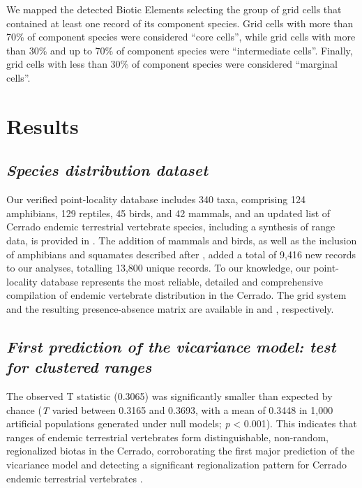 \documentclass[12pt,openright,oneside,a4paper,english]{abntex2}
\begin{document}
We mapped the detected Biotic Elements selecting the group of grid cells that contained at least one record of its component species. Grid cells with more than 70\% of component species were considered “core cells”, while grid cells with more than 30\% and up to 70\% of component species were “intermediate cells”. Finally, grid cells with less than 30\% of component species were considered “marginal cells”.

\section{Results}
\subsection{\textit{Species distribution dataset}}

Our verified point-locality database includes 340 taxa, comprising 124 amphibians, 129 reptiles, 45 birds, and 42 mammals, and an updated list of Cerrado endemic terrestrial vertebrate species, including a synthesis of range data, is provided in . The addition of mammals and birds, as well as the inclusion of amphibians and squamates described after \citet{Azevedo2016}, added a total of 9,416 new records to our analyses, totalling 13,800 unique records. To our knowledge, our point-locality database represents the most reliable, detailed and comprehensive compilation of endemic vertebrate distribution in the Cerrado. The grid system and the resulting presence-absence matrix are available in  and , respectively.

\subsection{\textit{First prediction of the vicariance model: test for clustered ranges}}

The observed T statistic (0.3065) was significantly smaller than expected by chance (\textit{T} varied between 0.3165 and 0.3693, with a mean of 0.3448 in 1,000 artificial populations generated under null models; \textit{p} < 0.001). This indicates that ranges of endemic terrestrial vertebrates form distinguishable, non-random, regionalized biotas in the Cerrado, corroborating the first major prediction of the vicariance model and detecting a significant regionalization pattern for Cerrado endemic terrestrial vertebrates \citep{Hausdorf2003, Hennig2004, Hausdorf2006}.
\end{document}
